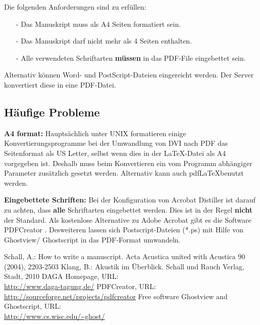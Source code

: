\documentclass[a4paper, 10pt, twocolumn]{article}
\begin{document}
Die folgenden Anforderungen sind zu erfüllen:
\begin{itemize}
    \item[-] Das Manuskript muss als A4 Seiten formatiert sein.
    \item[-] Das Manuskript darf nicht mehr als 4 Seiten enthalten.
    \item[-] Alle verwendeten Schriftarten \textbf{müssen} in das PDF-File eingebettet sein.
\end{itemize}
Alternativ können Word- und PostScript-Dateien eingereicht werden. Der Server konvertiert diese in eine PDF-Datei.
\subsection*{Häufige Probleme}
\textbf{A4 format:} Hauptsächlich unter UNIX formatieren einige Konvertierungsprogramme bei der Umwandlung von DVI nach PDF das Seitenformat als US Letter, selbst wenn dies in der \LaTeX-Datei als A4 vorgegeben ist. Deshalb muss beim Konvertieren ein vom Programm abhängiger Parameter zusätzlich gesetzt werden.
Alternativ kann auch pdf\LaTeX benutzt werden.

\textbf{Eingebettete Schriften:} Bei der Konfiguration von Acrobat Distiller ist darauf zu achten, dass \textbf{alle} Schriftarten eingebettet werden. Dies ist in der Regel \textbf{nicht} der Standard. Als kostenlose Alternative zu Adobe Acrobat gibt es die Software PDFCreator \cite{PDFCreator}. Desweiteren lassen sich Postscript-Dateien (*.ps) mit Hilfe von Ghostview/ Ghostscript \cite{Ghostware} in das PDF-Format umwandeln.
\begin{thebibliography}{5}
Schall, A.: How to write a manuscript. Acta Acustica united with
Acustica 90 (2004), 2203-2503
Klang, B.: Akustik im Überblick. Schall und Rauch Verlag, Stadt,
2010
DAGA Homepage, URL:\\
\url{http://www.daga-tagung.de/}
PDFCreator, URL:\\
\url{http://sourceforge.net/projects/pdfcreator}
Free software Ghostview and Ghostscript, URL:\\
\url{http://www.cs.wisc.edu/~ghost/}
\end{thebibliography}
\end{document}
